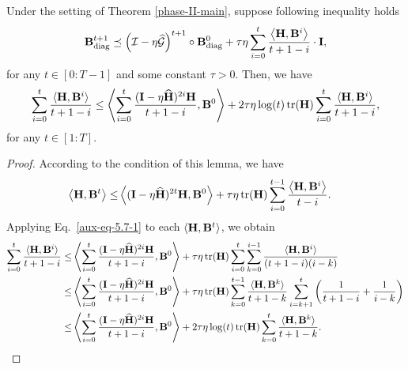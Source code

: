 \begin{lemma}\label{aux-7}
    Under the setting of Theorem \ref{phase-II-main}, suppose following inequality holds 
    \begin{align}
        \mathbf{B}_{\operatorname*{diag}}^{t+1}\preceq\left(\mathcal{I}-\eta\widehat{\mathcal{G}}\right)^{t+1}\circ\mathbf{B}_{\operatorname*{diag}}^0+\tau\eta\sum_{i=0}^t\frac{\left\langle\mathbf{H},\mathbf{B}^i\right\rangle}{t+1-i}\cdot\mathbf{I},\notag
    \end{align}
    for any $t\in[0:T-1]$ and some constant $\tau>0$. Then, we have
    \begin{align}
        \sum_{i=0}^{t}\frac{\langle\mathbf{H},\mathbf{B}^i\rangle}{t+1-i}\leq\left\langle\sum_{i=0}^t\frac{(\mathbf{I}-\eta\widehat{\mathbf{H}})^{2i}\mathbf{H}}{t+1-i},\mathbf{B}^0\right\rangle+2\tau\eta\log(t)\operatorname*{tr}(\mathbf{H})\sum_{i=0}^t\frac{\langle\mathbf{H},\mathbf{B}^i\rangle}{t+1-i},\notag
    \end{align}
    for any $t\in[1:T]$.
\end{lemma}
\begin{proof}
    According to the condition of this lemma, we have 
    \begin{align}\label{aux-eq-5.7-1}
        \left\langle\mathbf{H},\mathbf{B}^{t}\right\rangle\leq&\left\langle(\mathbf{I}-\eta\widehat{\mathbf{H}})^{2t}\mathbf{H},\mathbf{B}^0\right\rangle+\tau\eta\operatorname*{tr}(\mathbf{H})\sum_{i=0}^{t-1}\frac{\left\langle\mathbf{H},\mathbf{B}^i\right\rangle}{t-i}.
    \end{align}
    Applying Eq.~\eqref{aux-eq-5.7-1} to each $\langle\mathbf{H},\mathbf{B}^t\rangle$, we obtain
    \begin{align}
        \sum_{i=0}^{t}\frac{\langle\mathbf{H},\mathbf{B}^i\rangle}{t+1-i}\leq&\left\langle\sum_{i=0}^t\frac{(\mathbf{I}-\eta\widehat{\mathbf{H}})^{2i}\mathbf{H}}{t+1-i},\mathbf{B}^0\right\rangle+\tau\eta\operatorname*{tr}(\mathbf{H})\sum_{i=0}^t\sum_{k=0}^{i-1}\frac{\langle\mathbf{H},\mathbf{B}^i\rangle}{(t+1-i)(i-k)}\notag
        \\
        \leq&\left\langle\sum_{i=0}^t\frac{(\mathbf{I}-\eta\widehat{\mathbf{H}})^{2i}\mathbf{H}}{t+1-i},\mathbf{B}^0\right\rangle+\tau\eta\operatorname*{tr}(\mathbf{H})\sum_{k=0}^{t-1}\frac{\langle\mathbf{H},\mathbf{B}^k\rangle}{t+1-k}\sum_{i=k+1}^t\left(\frac{1}{t+1-i}+\frac{1}{i-k}\right)\notag
        \\
        \leq&\left\langle\sum_{i=0}^t\frac{(\mathbf{I}-\eta\widehat{\mathbf{H}})^{2i}\mathbf{H}}{t+1-i},\mathbf{B}^0\right\rangle+2\tau\eta\log(t)\operatorname*{tr}(\mathbf{H})\sum_{k=0}^t\frac{\langle\mathbf{H},\mathbf{B}^k\rangle}{t+1-k}.\notag
    \end{align}
\end{proof}